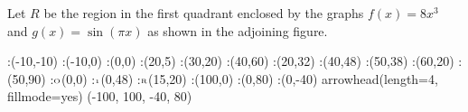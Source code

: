 \question Let $R$ be the region in the first quadrant enclosed by the graphs $f(x)=8x^3$ and 
$g(x)= \sin(\pi x)$ as shown in the adjoining figure.	



  \begin{marginfigure}
      :(-10,-10)
      :(-10,0)
      :(0,0)
      :(20,5)
      :(30,20)
      :(40,60)
      :(20,32)
      :(40,48)
      :(50,38)
      :(60,20)
      :(50,90)
      \def\Xmax{100}
      \def\Ymax{80}
      \def\Xmin{-100}
      \def\Ymin{-40}
      :$\tiny\text{O}$(0,0)
      :$\tiny\text{1}$(0,48)
      :$\tiny\text{R}$(15,20)
      :(\Xmax,0)
      :(0,\Ymax)
      :(0,\Ymin)
    \figdrawbegin{}
      \figset arrowhead(length=4, fillmode=yes)
      (\Xmin, \Xmax, \Ymin, \Ymax)
      \figdrawcurve [1,10,50,60,70,80]
      \figdrawcurve [2,10,20,30,40,90]
    \figdrawend
    \centerline{\box\figBoxA}
  \end{marginfigure}

